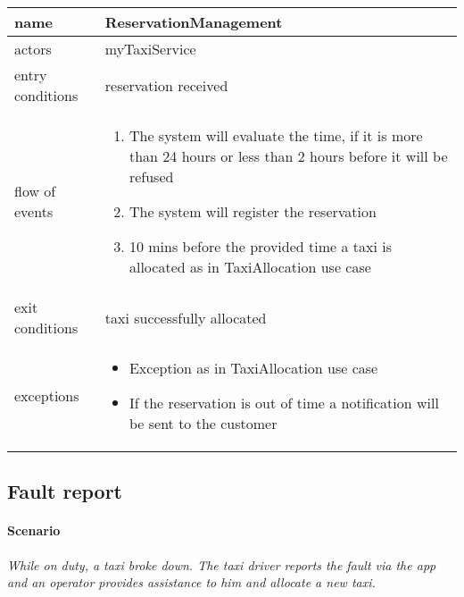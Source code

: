 


	\begin{fullwidth}
		\begin{tabularx}{\fullwidthlength}{ l X }
	\toprule
	name	&	ReservationManagement
	\\ \midrule
	actors	&	myTaxiService
	\\ \midrule
	entry conditions & reservation received
	\\ \midrule
	flow of events & \begin{enumerate}
	
		\item The system will evaluate the time, if it is more than 24 hours or less than 2 hours before it will be refused
		\item The system will register the reservation
		\item 10 mins before the provided time a taxi is allocated as in TaxiAllocation use case
	
	\end{enumerate}\\ \midrule
	exit conditions	&	 taxi successfully allocated
	\\ \midrule
	exceptions & \begin{itemize}
		
		\item Exception as in TaxiAllocation use case
		\item If the reservation is out of time a notification will be sent to the customer
	
	\end{itemize}\\ \bottomrule
\end{tabularx}
	\end{fullwidth}






\subsection{Fault report}
\paragraph{Scenario}\begin{fullwidth}\small\itshape While on duty, a taxi broke down. The taxi driver reports the fault via the app and an operator provides assistance to him and allocate a new taxi.\end{fullwidth}


